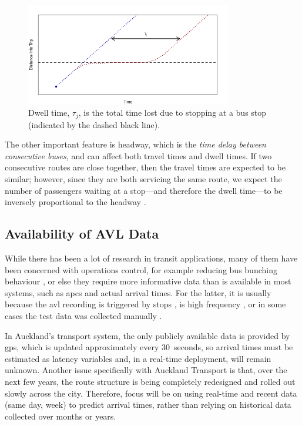 \documentclass[12pt,a4paper]{article}
\begin{document}
\begin{figure}[bt]
  \centering
  \includegraphics[width=0.8\textwidth]{dwell_time.png}
  \caption{Dwell time, $\tau_j$, is the total time lost due to stopping at a bus stop (indicated by the dashed black line).}
  \label{fig:dwell-time}
\end{figure}

The other important feature is headway,
which is the \emph{time delay between consecutive buses},
and can affect both travel times and dwell times.
If two consecutive routes are close together,
then the travel times are expected to be similar;
however, since they are both servicing the same route,
we expect the number of passengers waiting at a stop---and therefore
the dwell time---to be inversely proportional to the headway
\citep{hans-etal:2014,hans-etal:2015}.





\subsection{Availability of AVL Data}
\label{sec:data-types}

While there has been a lot of research in transit applications,
many of them have been concerned with operations control,
for example reducing bus bunching behaviour \citep{hans-etal:2015},
or else they require more informative data than is available in most systems,
such as \glspl{apc} and actual arrival times.
For the latter, it is usually because the \gls{avl} recording is triggered by stops
\citep{hans-etal:2015},
is high frequency \citep{chang-etal:2010},
or in some cases the test data was collected manually
\citep{yu-etal:2010}.


In Auckland's transport system, the only publicly available data is provided
by \gls{gps}, which is updated approximately every 30~seconds,
so arrival times must be estimated as latency variables and,
in a real-time deployment, will remain unknown.
Another issue specifically with Auckland Transport is that,
over the next few years,
the route structure is being completely redesigned
and rolled out slowly across the city.
Therefore, focus will be on using real-time and recent data (same day, week) to predict arrival times,
rather than relying on historical data collected over months or years.
\end{document}
